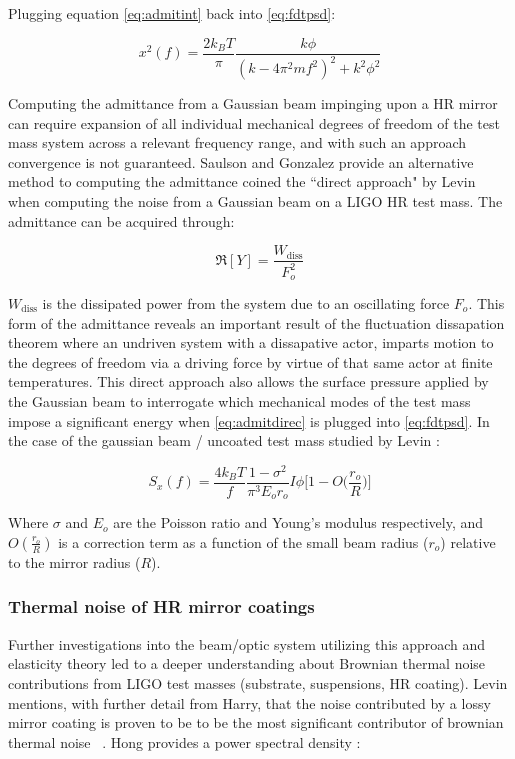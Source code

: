 \noindent Plugging equation \autoref{eq:admitint} back into \autoref{eq:fdtpsd}:

\begin{equation}
x^2 (f)  = \frac{2k_B T}{\pi}\frac{k\phi}{(k-4\pi^2 m f^2)^2 + k^2 \phi^2}
\end{equation}

Computing the admittance from a Gaussian beam impinging upon a HR mirror can require expansion of all individual mechanical degrees of freedom of the test mass system across a relevant frequency range, and with such an approach convergence is not guaranteed. Saulson and Gonzalez provide an alternative method to computing the admittance coined the ``direct approach" by Levin when computing the noise from a Gaussian beam on a LIGO HR test mass. The admittance can be acquired through:

\begin{equation}\label{eq:admitdirec}
\Re[Y] = \frac{W_\mathrm{diss}}{F_o^2}
\end{equation}

\noindent $W_\mathrm{diss}$ is the dissipated power from the system due to an oscillating force $F_o$. This form of the admittance reveals an important result of the fluctuation dissapation theorem where an undriven system with a dissapative actor, imparts motion to the degrees of freedom via a driving force by virtue of that same actor at finite temperatures. This direct approach also allows the surface pressure applied by the Gaussian beam to interrogate which mechanical modes of the test mass impose a significant energy when \autoref{eq:admitdirec} is plugged into \autoref{eq:fdtpsd}. In the case of the gaussian beam / uncoated test mass studied by Levin \cite{levin:1998}:

\begin{equation}
S_x(f) = \frac{4 k_B T}{f} \frac{1-\sigma^2}{\pi^3 E_o r_o} I\phi \bigg[1- O\bigg( \frac{r_o}{R} \bigg)\bigg]
\end{equation}


\noindent Where $\sigma$ and $E_o$ are the Poisson ratio and Young's modulus respectively, and $O(\frac{r_o}{R})$ is a correction term as a function of the small beam radius ($r_o$) relative to the mirror radius ($R$).

\subsubsection*{Thermal noise of HR mirror coatings}
Further investigations into the beam/optic system utilizing this approach and elasticity theory led to a deeper understanding about Brownian thermal noise contributions from LIGO test masses (substrate, suspensions, HR coating). Levin mentions, with further detail from Harry, that the noise contributed by a lossy mirror coating is proven to be to be the most significant contributor of brownian thermal noise ~\cite{harry:2006}. Hong provides a power spectral density \cite{hong:2013}:

